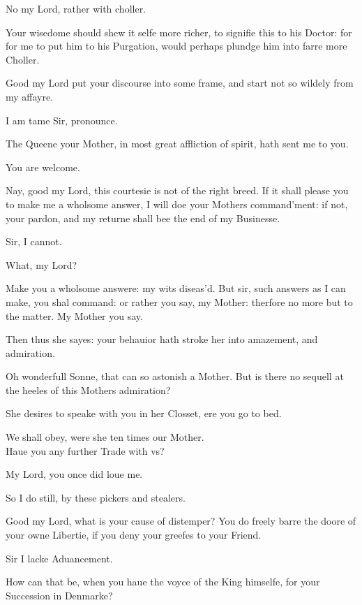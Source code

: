 \documentclass[a5paper,DIV=calc,11pt]{scrbook}
\begin{document}
\begin{drama*}
    \guilspeaks No my Lord, rather with choller.
    
    \hamspeaks Your wisedome should shew it selfe more richer, to signifie this to his Doctor: for for me to put him to his Purgation, would perhaps plundge him into farre more Choller.
    
    \guilspeaks Good my Lord put your discourse into some frame, and start not so wildely from my affayre.
    
    \hamspeaks I am tame Sir, pronounce.
    
    \guilspeaks The Queene your Mother, in most great affliction of spirit, hath sent me to you.
    
    \hamspeaks You are welcome.
    
    \guilspeaks Nay, good my Lord, this courtesie is not of the right breed. If it shall please you to make me a wholsome answer, I will doe your Mothers command'ment: if not, your pardon, and my returne shall bee the end of my Businesse.
    
    \hamspeaks Sir, I cannot.
    
    \guilspeaks What, my Lord?
    
    \hamspeaks Make you a wholsome answere: my wits diseas'd. But sir, such answers as I can make, you shal command: or rather you say, my Mother: therfore no more but to the matter. My Mother you say.
    
    \rosinspeaks Then thus she sayes: your behauior hath stroke her into amazement, and admiration.
    
    \hamspeaks Oh wonderfull Sonne, that can so astonish a Mother. But is there no sequell at the heeles of this Mothers admiration?
    
    \rosinspeaks She desires to speake with you in her Closset, ere you go to bed.
    
    \hamspeaks We shall obey, were she ten times our Mother.\\
    Haue you any further Trade with vs?
    
    \rosinspeaks My Lord, you once did loue me.
    
    \hamspeaks So I do still, by these pickers and stealers.
    
    \rosinspeaks Good my Lord, what is your cause of distemper? You do freely barre the doore of your owne Libertie, if you deny your greefes to your Friend.
    
    \hamspeaks Sir I lacke Aduancement.
    
    \rosinspeaks How can that be, when you haue the voyce of the King himselfe, for your Succession in Denmarke?
    

\end{drama*}
\end{document}
